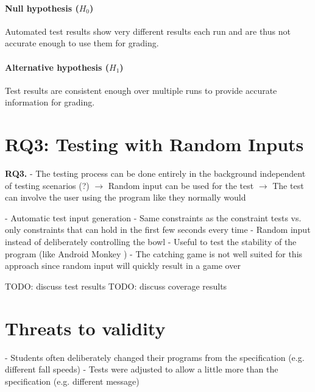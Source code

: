 \paragraph{Null hypothesis ($H_0$)}
Automated test results show very different results each run and are thus not accurate enough to use them for grading.
\paragraph{Alternative hypothesis ($H_1$)}
Test results are consistent enough over multiple runs to provide accurate information for grading.

\section{RQ3: Testing with Random Inputs}

\textbf{RQ3.}
- The testing process can be done entirely in the background independent of testing scenarios (?)
    $\rightarrow$ Random input can be used for the test
    $\rightarrow$ The test can involve the user using the program like they normally would


- Automatic test input generation
- Same constraints as the constraint tests vs. only constraints that can hold in the first few seconds every time
    - Random input instead of deliberately controlling the bowl
    - Useful to test the stability of the program (like Android Monkey \cite{androidmonkey})
    - The catching game is not well suited for this approach since random input will quickly result in a game over

TODO: discuss test results
TODO: discuss coverage results


\section{Threats to validity}
- Students often deliberately changed their programs from the specification (e.g. different fall speeds)
    - Tests were adjusted to allow a little more than the specification (e.g. different message)

